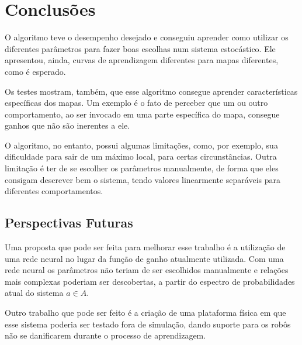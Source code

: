 

\chapter{Conclusões} \label{Chap:Conclusoes}

O algoritmo teve o desempenho desejado e conseguiu aprender como utilizar os diferentes parâmetros para fazer boas escolhas num sistema estocástico. Ele apresentou, ainda, curvas  de aprendizagem diferentes para mapas diferentes, como é esperado.

Os testes mostram, também, que esse algoritmo consegue aprender características específicas dos mapas. Um exemplo é o fato de perceber que um ou outro comportamento, ao ser invocado em uma parte específica do mapa, consegue ganhos que não são inerentes a ele.

O algoritmo, no entanto, possui algumas limitações, como, por exemplo, sua dificuldade para sair de um máximo local, para certas circunstâncias. Outra limitação é ter de se escolher os parâmetros manualmente, de forma que eles consigam descrever bem o sistema, tendo valores linearmente separáveis para diferentes comportamentos.

\section{Perspectivas Futuras}

Uma proposta que pode ser feita para melhorar esse trabalho é a utilização de uma rede neural no lugar da função de ganho atualmente utilizada. Com uma rede neural os parâmetros não teriam de ser escolhidos manualmente e relações mais complexas poderiam ser descobertas, a partir do espectro de probabilidades atual do sistema $ a \in A $.

Outro trabalho que pode ser feito é a criação de uma plataforma física em que esse sistema poderia ser testado fora de simulação, dando suporte para os robôs não se danificarem durante o processo de aprendizagem.
